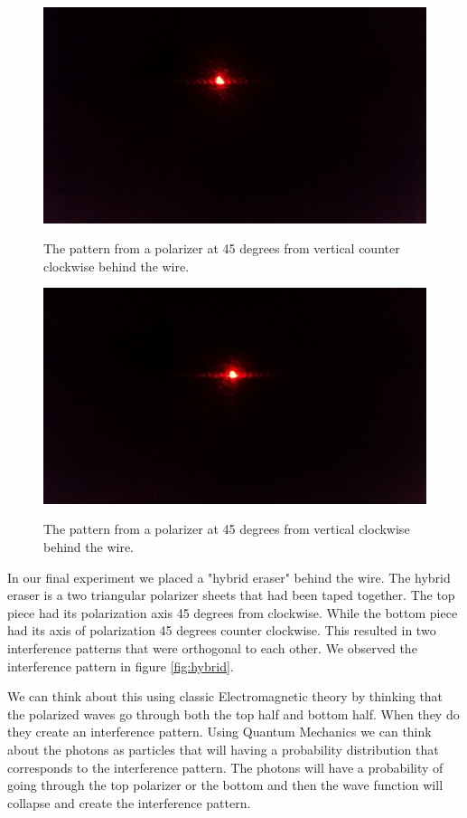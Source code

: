 \documentclass[12pt letterpaper]{article}
\begin{document}
\begin{figure}[H]
  \caption{The pattern from a polarizer at 45 degrees from vertical counter clockwise behind the wire.}
  \centering
    \includegraphics[width=.75\textwidth]{erased1.jpg}
    \label{fig:erased1}
\end{figure}

\begin{figure}[H]
  \caption{The pattern from a polarizer at 45 degrees from vertical clockwise behind the wire.}
  \centering
    \includegraphics[width=.75\textwidth]{erased2.jpg}
    \label{fig:erased2}
\end{figure}

In our final experiment we placed a "hybrid eraser" behind the wire. The hybrid eraser is a two triangular polarizer sheets that had been taped together. The top piece had its polarization axis 45 degrees from clockwise. While the bottom piece had its axis of polarization 45 degrees counter clockwise. This resulted in two interference patterns that were orthogonal to each other. We observed the interference pattern in figure \ref{fig:hybrid}. 

We can think about this using classic Electromagnetic theory by thinking that the polarized waves go through both the top half and bottom half. When they do they create an interference pattern. Using Quantum Mechanics we can think about the photons as particles that will having a probability distribution that corresponds to the interference pattern. The photons will have a probability of going through the top polarizer or the bottom and then the wave function will collapse and create the interference pattern. 
\end{document}
